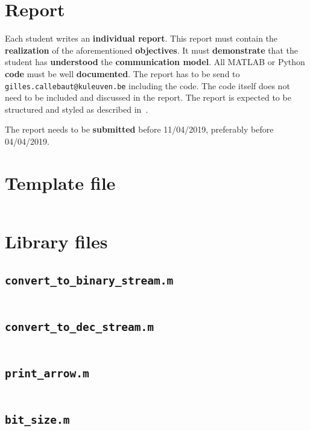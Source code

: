 \documentclass[12pt,a4paper]{article}
\newcommand{\softDeadline}{04/04/2019}
\newcommand{\hardDeadline}{11/04/2019}
\begin{document}
\section{Report}
Each student writes an \textbf{individual report}. This report must contain the \textbf{realization} of the aforementioned \textbf{objectives}. It must \textbf{demonstrate} that the student has \textbf{understood} the \textbf{communication model}. All MATLAB or Python \textbf{code} must be well \textbf{documented}.
The report has to be send to \texttt{gilles.callebaut@kuleuven.be} including the code. The code itself does not need to be included and discussed in the report.
The report is expected to be structured and styled as described in~\cite{hoogenboom2012write,kallestinova2011write}.

The report needs to be \textbf{submitted} before \hardDeadline, preferably before \softDeadline.

\cleardoublepage%
\appendix
\section{Template file}
\inputminted[linenos,tabsize=2,breaklines, fontsize=\footnotesize]{matlab}{../code/main.m}
\clearpage
\section{Library files}
\subsection{\texttt{convert\_to\_binary\_stream.m}}
\inputminted[linenos,tabsize=2,breaklines, fontsize=\footnotesize]{matlab}{../code/convert_to_binary_stream.m}
\subsection{\texttt{convert\_to\_dec\_stream.m}}
\inputminted[linenos,tabsize=2,breaklines, fontsize=\footnotesize]{matlab}{../code/convert_to_dec_stream.m}
\subsection{\texttt{print\_arrow.m}}
\inputminted[linenos,tabsize=2,breaklines, fontsize=\footnotesize]{matlab}{../code/print_arrow.m}
\clearpage
\subsection{\texttt{bit\_size.m}}
\inputminted[linenos,tabsize=2,breaklines, fontsize=\footnotesize]{matlab}{../code/bit_size.m}
\end{document}
